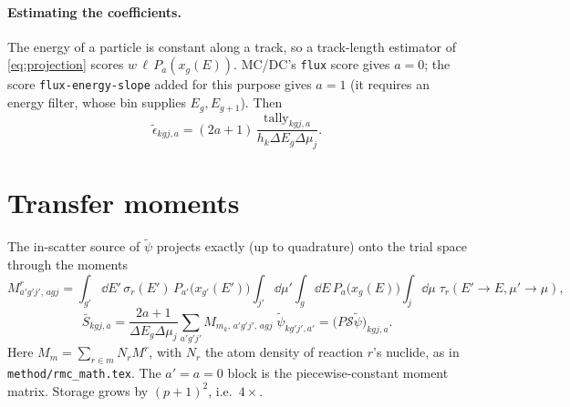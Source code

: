 \documentclass[11pt]{article}
\newcommand{\tpsi}{\tilde\psi}
\newcommand{\teps}{\tilde\epsilon}
\newcommand{\Sbar}{\bar S}
\begin{document}
\paragraph{Estimating the coefficients.} The energy of a particle is constant along a
track, so a track-length estimator of \eqref{eq:projection} scores
$w\,\ell\,P_a(x_g(E))$. MC/DC's \texttt{flux} score gives $a=0$; the score
\texttt{flux-energy-slope} added for this purpose gives $a=1$ (it requires an
energy filter, whose bin supplies $E_g, E_{g+1}$). Then
\begin{equation}
  \teps_{kgj,a} = (2a+1)\,\frac{\text{tally}_{kgj,a}}{h_k\Delta E_g\Delta\mu_j}.
\end{equation}

\section{Transfer moments}

The in-scatter source of $\tpsi$ projects exactly (up to quadrature) onto the trial
space through the moments
\begin{equation}
  M^r_{a'g'j',\,agj} = \int_{g'}\!\dd E'\,\sigma_r(E')\,P_{a'}\big(x_{g'}(E')\big)
  \int_{j'}\!\dd\mu'\int_g\!\dd E\,P_a\big(x_g(E)\big)\int_j\!\dd\mu\;
  \tau_r(E'\!\to E,\mu'\!\to\mu),
  \label{eq:moments}
\end{equation}
\begin{equation}
  \Sbar_{kgj,a} = \frac{2a+1}{\Delta E_g\Delta\mu_j}
  \sum_{a'g'j'} M_{m_k,\,a'g'j',\,agj}\;\tpsi_{kg'j',a'} = \big(P\mathcal S\tpsi\big)_{kgj,a}.
\end{equation}
Here $M_m=\sum_{r\in m}N_rM^r$, with $N_r$ the atom density of reaction $r$'s
nuclide, as in \texttt{method/rmc\_math.tex}.
The $a'=a=0$ block is the piecewise-constant moment matrix. Storage grows by
$(p+1)^2$, i.e.\ $4\times$.
\end{document}
